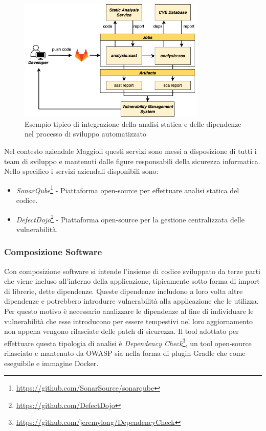 \begin{figure}[H]
\centering
\includegraphics[width=0.8\textwidth]{img/tesi-12-sastsca.drawio.png}
\caption{Esempio tipico di integrazione della analisi statica e delle dipendenze nel processo di sviluppo automatizzato}
\end{figure}

Nel contesto aziendale Maggioli questi servizi sono messi a disposizione di tutti i team di sviluppo e mantenuti dalle figure responsabili della sicurezza informatica. Nello specifico i servizi aziendali disponibili sono:
\begin{itemize}
    \item \textit{SonarQube}\footnote{\url{https://github.com/SonarSource/sonarqube}} - Piattaforma open-source per effettuare analisi statica del codice.
    \item \textit{DefectDojo}\footnote{\url{https://github.com/DefectDojo}} - Piattaforma open-source per la gestione centralizzata delle vulnerabilità.
\end{itemize}

\subsubsection{Composizione Software}
Con composizione software si intende l'insieme di codice sviluppato da terze parti che viene incluso all'interno della applicazione, tipicamente sotto forma di import di librerie, dette dipendenze. Queste dipendenze includono a loro volta altre dipendenze e potrebbero introdurre vulnerabilità alla applicazione che le utilizza. \\
Per questo motivo è necessario analizzare le dipendenze al fine di individuare le vulnerabilità che esse introducono per essere tempestivi nel loro aggiornamento non appena vengono rilasciate delle patch di sicurezza. Il tool adottato per effettuare questa tipologia di analisi è \textit{Dependency Check}\footnote{\url{https://github.com/jeremylong/DependencyCheck}}, un tool open-source rilasciato e mantenuto da OWASP sia nella forma di plugin Gradle che come eseguibile e immagine Docker.

